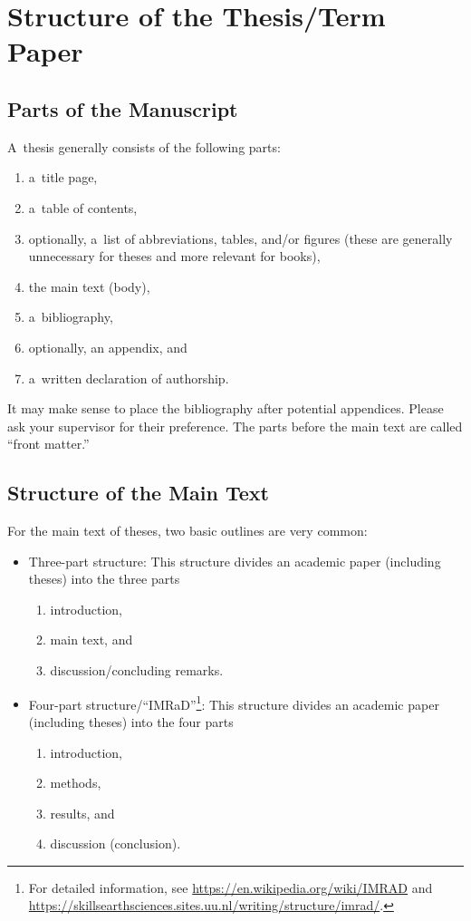 \section{Structure of the Thesis\slash Term Paper}%
\label{sec:structure}

\subsection{Parts of the Manuscript}

A~thesis generally consists of the following parts:
\begin{enumerate}
	\item a~title page,
	\item a~table of contents,
	\item optionally, a~list of abbreviations, tables, and/or figures (these are generally unnecessary for theses and more relevant for books),
	\item the main text (body),
	\item a~bibliography,
	\item optionally, an appendix, and
	\item a~written declaration of authorship.
\end{enumerate}
It may make sense to place the bibliography after potential appendices. Please ask your supervisor for their preference. The parts before the main text are called ``front matter.''

\subsection{Structure of the Main Text}

For the main text of theses, two basic outlines are very common:
\begin{itemize}
	\item Three-part structure: This structure divides an academic paper (including theses) into the three parts
		\begin{enumerate}
			\item introduction,
			\item main text, and
			\item discussion/concluding remarks.
		\end{enumerate}
	\item Four-part structure/``IMRaD''\footnote{For detailed information, see \url{https://en.wikipedia.org/wiki/IMRAD} and \url{https://skillsearthsciences.sites.uu.nl/writing/structure/imrad/}.}: This structure divides an academic paper (including theses) into the four parts
		\begin{enumerate}
			\item introduction,
			\item methods,
			\item results, and
			\item discussion (conclusion).
		\end{enumerate}
\end{itemize}

